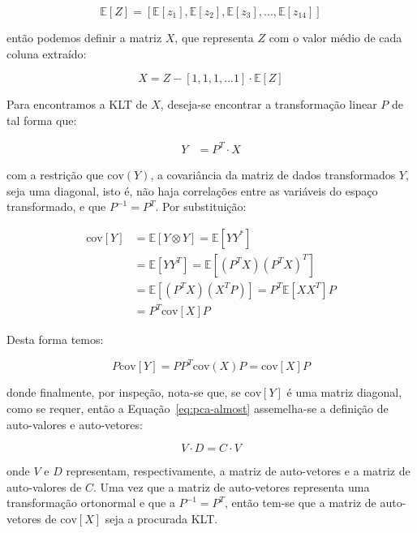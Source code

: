 \begin{equation}
\mathbb{E}[Z] = [\mathbb{E}[z_1], \mathbb{E}[z_2], \mathbb{E}[z_3], ...,
\mathbb{E}[z_{14}]]
\end{equation}

\noindent então podemos definir a matriz $X$, que representa $Z$ com o valor
médio de cada coluna extraído:

\begin{equation}
X = Z - [1, 1, 1, ... 1] \cdot \mathbb{E}[Z]
\end{equation}

Para encontramos a KLT de $X$, deseja-se encontrar a transformação linear $P$
de tal forma que:

\begin{align}
Y &= P^{T} \cdot X
\end{align}

\noindent com a restrição que $\text{cov}(Y)$, a covariância da matriz de
dados transformados $Y$, seja uma diagonal, isto é, não haja correlações entre
as variáveis do espaço transformado, e que $P^{-1} = P^{T}$. Por substituição:

\begin{align}
\text{cov}[Y] &= \mathbb{E}[Y \otimes Y] = \mathbb{E}[YY^{*}] \\
              &= \mathbb{E}[YY^T] = \mathbb{E}[(P^T X)(P^T X)^T] \\
              &= \mathbb{E}[(P^T X)(X^T P)] = P^T \mathbb{E}[XX^T] P \\
              &= P^T \text{cov}[X] P
\end{align}

Desta forma temos:

\begin{equation}
P\text{cov}[Y] = PP^T\text{cov}(X)P = \text{cov}[X]P
\label{eq:pca-almost}
\end{equation}

\noindent donde finalmente, por inspeção, nota-se que, se $\text{cov}[Y]$ é
uma matriz diagonal, como se requer, então a Equação~\ref{eq:pca-almost}
assemelha-se a definição de auto-valores e auto-vetores:

\begin{equation}
V \cdot D = C \cdot V
\end{equation}

\noindent onde $V$ e $D$ representam, respectivamente, a matriz de
auto-vetores e a matriz de auto-valores de $C$. Uma vez que a matriz de
auto-vetores representa uma transformação ortonormal e que a $P^{-1} = P^T$,
então tem-se que a matriz de auto-vetores de $\text{cov}[X]$ seja a procurada
KLT. 

